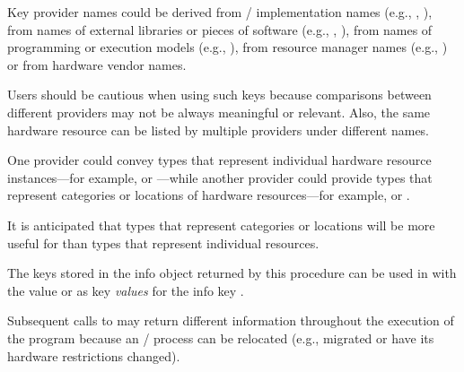 \begin{implementors}
  Key provider names could be derived from \MPI/ implementation names (e.g., , ),
  from names of external libraries or pieces of software (e.g., , ), from names
  of programming or execution models (e.g., ), from resource manager names (e.g., )
  or from hardware vendor names.
\end{implementors}

\begin{users}
  Users should be cautious when using such keys because comparisons between different providers may not be always
  meaningful or relevant. Also, the same hardware resource can be listed by multiple providers under different
  names.
  
\begin{sloppy}  One provider could convey types that represent individual hardware resource instances---for example,  or ---while another provider could provide types that represent categories or locations of hardware resources{\hspace{0pt}}---for example,  or .
\end{sloppy}
  
  It is anticipated that types that represent categories
  or locations will be more useful for 
  than types that represent individual resources.
\end{users}

\begin{users}  
  The keys stored in the info object returned by this procedure can be used in
   with the   value  
  or  as key \emph{values} for the info key .
\end{users}

Subsequent calls to  may return different information throughout the execution
of the program because an \MPI/ process can be relocated (e.g., migrated or have its hardware restrictions changed).

